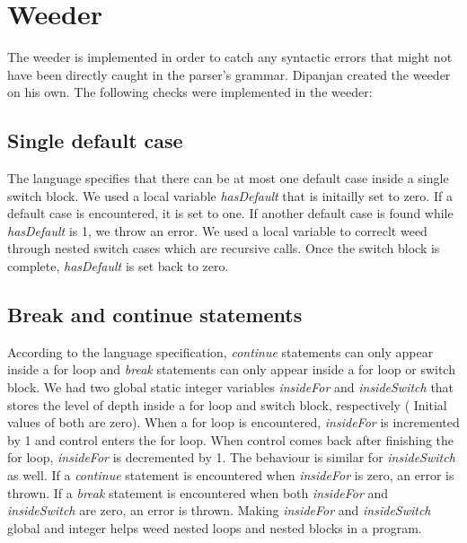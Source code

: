 \documentclass[preprint,12pt]{elsarticle}
\begin{document}
\section{Weeder}

The weeder is implemented in order to catch any syntactic errors that might not have been directly caught in the parser's grammar. Dipanjan created the weeder on his own. The following checks were implemented in the weeder:

\subsection{Single default case}
The language specifies that there can be at most one default case inside a single switch block. We used a local variable \textit{hasDefault} that is initailly set to zero. If a default case is encountered, it is set to one. If another default case is found while \textit{hasDefault} is 1, we throw an error. We used a local variable to correclt weed through nested switch cases which are recursive calls. Once the switch block is complete, \textit{hasDefault} is set back to zero.

\subsection{Break and continue statements}
According to the language specification, \textit{continue} statements can only appear inside a for loop and \textit{break} statements can only appear inside a for loop or switch block. We had two global static integer variables \textit{insideFor} and \textit{insideSwitch} that stores the level of depth inside a for loop and switch block, respectively ( Initial values of both are zero). When a for loop is encountered, \textit{insideFor} is incremented by 1 and control enters the for loop. When control comes back after finishing the for loop, \textit{insideFor} is decremented by 1. The behaviour is similar for \textit{insideSwitch} as well. If a \textit{continue} statement is encountered when \textit{insideFor} is zero, an error is thrown. If a \textit{break} statement is encountered when both \textit{insideFor} and \textit{insideSwitch} are zero, an error is thrown. Making \textit{insideFor} and \textit{insideSwitch} global and integer helps weed nested loops and nested blocks in a program.
\end{document}
